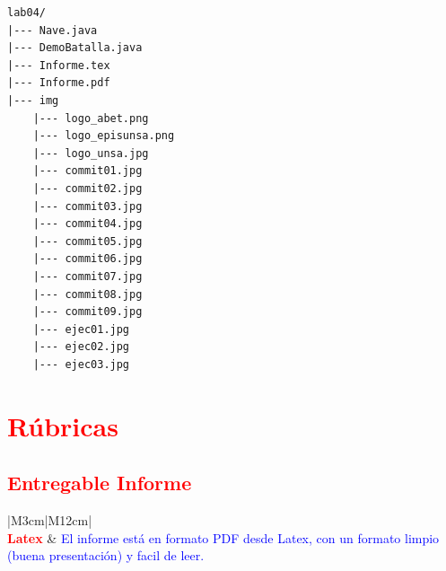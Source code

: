 \documentclass{article}
\begin{document}
\begin{lstlisting}[style=ascii-tree]
lab04/
|--- Nave.java
|--- DemoBatalla.java
|--- Informe.tex
|--- Informe.pdf
|--- img
	|--- logo_abet.png
	|--- logo_episunsa.png
	|--- logo_unsa.jpg
	|--- commit01.jpg
	|--- commit02.jpg
	|--- commit03.jpg
	|--- commit04.jpg
	|--- commit05.jpg
	|--- commit06.jpg
	|--- commit07.jpg
	|--- commit08.jpg
	|--- commit09.jpg
	|--- ejec01.jpg
	|--- ejec02.jpg
	|--- ejec03.jpg
\end{lstlisting}
\pagebreak

\section{\textcolor{red}{Rúbricas}}

\subsection{\textcolor{red}{Entregable Informe}}
\begin{table}[H]
	\caption{Tipo de Informe}
	\setlength{\tabcolsep}{0.5em} %
	{\renewcommand{\arraystretch}{1.5}%
		\begin{tabular}{|M{3cm}|M{12cm}|}
			\hline
			                                                                                                      \\
			\hline
			\textbf{\textcolor{red}{Latex}} & \textcolor{blue}{El informe está en formato PDF desde Latex,  con un formato limpio (buena presentación) y facil de leer.} \\
			\hline
		\end{tabular}
	}
\end{table}
\end{document}
